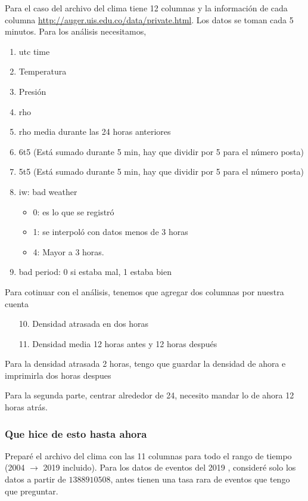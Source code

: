 	Para el caso del archivo del clima tiene 12 columnas y la información de cada columna \url{http://auger.uis.edu.co/data/private.html}. Los datos se toman cada 5 minutos. Para los análisis necesitamos,

			\begin{enumerate}
				\item utc time
				\item Temperatura
				\item Presión
				\item rho
				\item rho media durante las 24 horas anteriores
				\item 6t5 (Está sumado durante 5 min, hay que dividir por 5 para el número posta)
				\item 5t5 (Está sumado durante 5 min, hay que dividir por 5 para el número posta)
				\item iw: bad weather
					\begin{itemize}
						\item 0: es lo que se registró
						\item 1: se interpoló con datos menos de 3 horas
						\item 4: Mayor a 3 horas.
					\end{itemize}
				\item bad period: 0 si estaba mal, 1 estaba bien
			\end{enumerate}

	Para cotinuar con el  análisis, tenemos que agregar dos columnas por nuestra cuenta
			\begin{enumerate}
				\item[10.] Densidad atrasada en dos horas
				\item[11.] Densidad media 12 horas antes y 12 horas después
			\end{enumerate}
		Para la densidad atrasada 2 horas, tengo que guardar la densidad de ahora e imprimirla dos horas despues


		Para la segunda parte, centrar alrededor de 24, necesito mandar lo de ahora 12 horas atrás.

	\subsubsection{Que hice de esto hasta ahora}

	Preparé el archivo del clima con las 11 columnas para todo el rango de  tiempo (2004 $\rightarrow$ 2019 incluido). 	Para los datos de eventos del 2019 , consideré solo los datos a partir de $1388910508$, antes tienen una tasa rara de eventos que tengo que preguntar.


